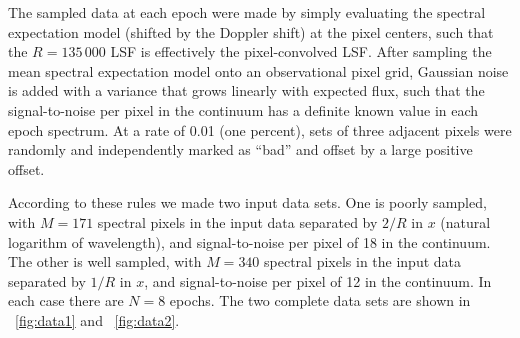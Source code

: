 \documentclass[modern]{aastex631}
\begin{document}
The sampled data at each epoch were made by simply evaluating the spectral expectation model (shifted by the Doppler shift) at the pixel centers, such that the $R=135\,000$ LSF is effectively the pixel-convolved LSF.
After sampling the mean spectral expectation model onto an observational pixel grid, Gaussian noise is added with a variance that grows linearly with expected flux, such that the signal-to-noise per pixel in the continuum has a definite known value in each epoch spectrum.
At a rate of 0.01 (one percent), sets of three adjacent pixels were randomly and independently marked as ``bad'' and offset by a large positive offset.

According to these rules we made two input data sets.
One is poorly sampled, with $M=171$ spectral pixels in the input data separated by $2/R$ in $x$ (natural logarithm of wavelength), and signal-to-noise per pixel of 18 in the continuum.
The other is well sampled, with $M=340$ spectral pixels in the input data separated by $1/R$ in $x$, and signal-to-noise per pixel of 12 in the continuum.
In each case there are $N=8$ epochs.
The two complete data sets are shown in \figurename~\ref{fig:data1} and \figurename~\ref{fig:data2}.
\end{document}
